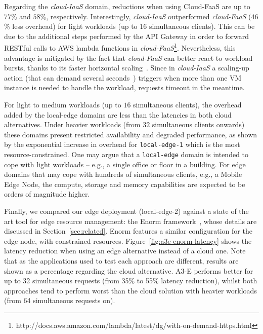   Regarding the \textit{cloud-IaaS} domain, reductions when using Cloud-FaaS are up to $77$\% and $58$\%, respectively. Interestingly, \textit{cloud-IaaS} outperformed  \textit{cloud-FaaS} ($46$\% less overhead) for light workloads (up to $16$ simultaneous clients). This can be due to the additional steps performed by the API Gateway in order to forward RESTful calls to AWS lambda functions in \textit{cloud-FaaS}\footnote{http://docs.aws.amazon.com/lambda/latest/dg/with-on-demand-https.html}. Nevertheless, this advantage is mitigated by the fact that \textit{cloud-FaaS} can better react to workload bursts, thanks to its faster horizontal scaling~\cite{Villamizar2017lambda,Hendrickson:2016}. Since in \textit{cloud-IaaS} a scaling-up action (that can demand several seconds~\cite{Quatrocchi2016discrete}) triggers when more than one VM instance is needed to handle the workload, requests timeout in the meantime. 
 
 For light to medium workloads (up to $16$ simultaneous clients), the overhead added by the local-edge domains are less than the latencies in both cloud alternatives. Under heavier workloads (from $32$ simultaneous clients onwards) these domains present restricted availability and degraded performance, as shown by the exponential increase in overhead for \texttt{local-edge-1} which is the most resource-constrained. One may argue that a \texttt{local-edge} domain is intended to cope with light workloads -- e.g., a single office or floor in a building. For edge domains that may cope with hundreds of simultaneous clients, e.g., a Mobile Edge Node, the compute, storage and memory capabilities are expected to be orders of magnitude higher.
 
Finally, we compared our edge deployment (local-edge-2) against a state of the art tool for edge resource management: the Enorm framework~\cite{wang2017enorm}, whose details are discussed in Section~\ref{sec:related}. Enorm features a similar configuration for the edge node, with constrained resources. Figure~\ref{fig:a3e-enorm-latency} shows the latency reduction when using an edge alternative instead of a cloud one. Note that as the applications used to test each approach are different, results are shown as a percentage regarding the cloud alternative. A3-E performs better for up to 32 simultaneous requests (from 35\% to 55\% latency reduction), whilst both approaches tend to perform worst than the cloud solution with heavier workloads (from 64 simultaneous requests on).  

